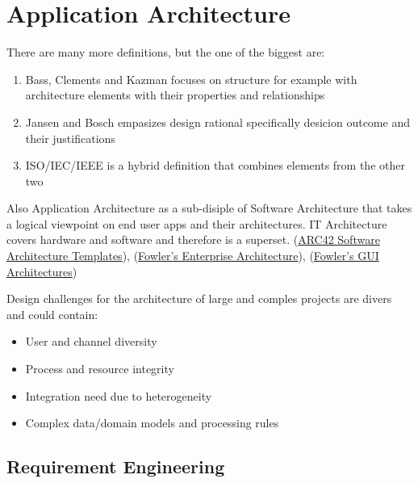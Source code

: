 \documentclass[../Main.tex]{subfiles}
\begin{document}
\chapter{Application Architecture}

\intro{

}


There are many more definitions, but the one of the biggest
are:
\begin{enumerate}
    \item Bass, Clements and Kazman focuses on structure
    for example with architecture elements with their properties
    and relationships
    \item Jansen and Bosch empasizes design rational specifically
    desicion outcome and their justifications
    \item ISO/IEC/IEEE is a hybrid definition that combines elements from the other two
\end{enumerate}

Also Application Architecture as a sub-disiple of Software Architecture
that takes a logical viewpoint on end user apps and their architectures.
IT Architecture covers hardware and software and therefore is a superset.
(\href{https://arc42.org/overview}{ARC42 Software Architecture Templates}),
(\href{https://martinfowler.com/eaaCatalog/index.html}{Fowler's Enterprise Architecture}),
(\href{https://martinfowler.com/eaaDev/uiArchs.html}{Fowler's GUI Architectures})

Design challenges for the architecture of large and comples projects are divers and could contain:
\begin{itemize}
    \item User and channel diversity
    \item Process and resource integrity
    \item Integration need due to heterogeneity
    \item Complex data/domain models and processing rules
\end{itemize}

\section{Requirement Engineering}
\end{document}
